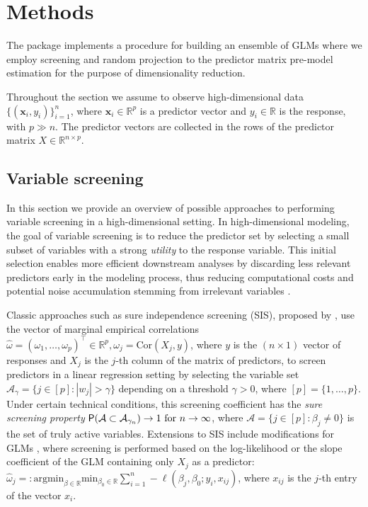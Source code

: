 \documentclass[
  article]{jss}
\begin{document}
\section{Methods}\label{sec-models}

The package implements a procedure for building an ensemble of GLMs
where we employ screening and random projection to the predictor matrix
pre-model estimation for the purpose of dimensionality reduction.

Throughout the section we assume to observe high-dimensional data
\(\{(\boldsymbol{x}_i,y_i)\}_{i=1}^n\), where
\(\boldsymbol{x}_i\in\mathbb{R}^p\) is a predictor vector and
\(y_i\in\mathbb{R}\) is the response, with \(p\gg n\). The predictor
vectors are collected in the rows of the predictor matrix
\(X\in \mathbb R^{n\times p}\).

\subsection{Variable screening}\label{variable-screening}

In this section we provide an overview of possible approaches to
performing variable screening in a high-dimensional setting. In
high-dimensional modeling, the goal of variable screening is to reduce
the predictor set by selecting a small subset of variables with a strong
\emph{utility} to the response variable. This initial selection enables
more efficient downstream analyses by discarding less relevant
predictors early in the modeling process, thus reducing computational
costs and potential noise accumulation stemming from irrelevant
variables \citep[see e.g.,][]{Dunson2020TargRandProj}.

Classic approaches such as sure independence screening (SIS), proposed
by \citet{Fan2007SISforUHD}, use the vector of marginal empirical
correlations
\(\hat\omega=(\omega_1,\ldots ,\omega_p)^\top\in\mathbb{R}^p,\omega_j=\text{Cor}(X_{j},y)\),
where \(y\) is the \((n\times 1)\) vector of responses and \(X_{j}\) is
the \(j\)-th column of the matrix of predictors, to screen predictors in
a linear regression setting by selecting the variable set
\(\mathcal{A}_\gamma = \{j\in [p]:|w_j|>\gamma\}\) depending on a
threshold \(\gamma>0\), where \([p]=\{1,\dots,p\}\). Under certain
technical conditions, this screening coefficient has the \emph{sure
screening property}
\(\mathsf{P}(\mathcal{A} \subset \mathcal{A}_{\gamma_n})\to 1 \text{ for } n\to \infty\),
where \(\mathcal{A}=\{j\in[p]:\beta_j\neq 0\}\) is the set of truly
active variables. Extensions to SIS include modifications for GLMs
\citep{Fan2010sisglms}, where screening is performed based on the
log-likelihood or the slope coefficient of the GLM containing only
\(X_j\) as a predictor:
\(\hat\omega_j=: \text{argmin}_{\beta\in\mathbb{R}}\text{min}_{{\beta_0}\in\mathbb{R}}\sum_{i=1}^n -\ell(\beta_j,\beta_0;y_i,x_{ij})\),
where \(x_{ij}\) is the \(j\)-th entry of the vector \(x_i\).
\end{document}
